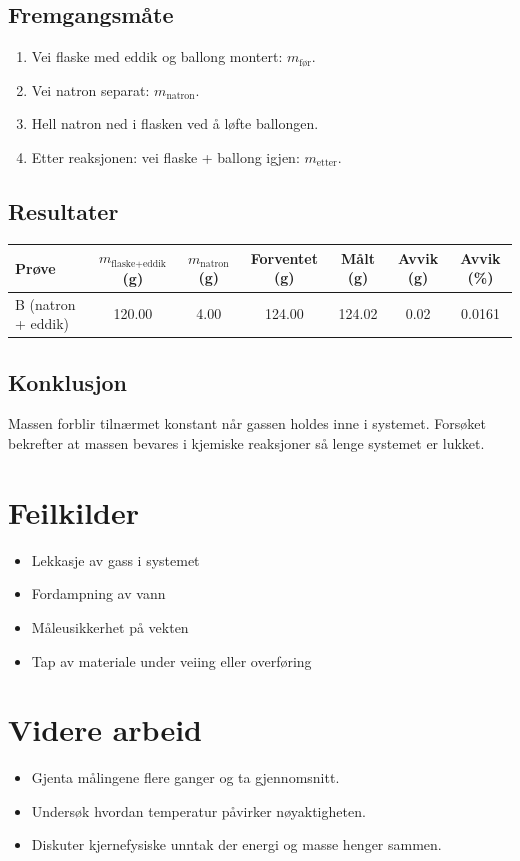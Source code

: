 \documentclass[a4paper,12pt]{article}
\begin{document}
\subsection*{Fremgangsmåte}
\begin{enumerate}
  \item Vei flaske med eddik og ballong montert: $m_\text{før}$.
  \item Vei natron separat: $m_\text{natron}$.
  \item Hell natron ned i flasken ved å løfte ballongen.
  \item Etter reaksjonen: vei flaske + ballong igjen: $m_\text{etter}$.
\end{enumerate}

\subsection*{Resultater}
\begin{table}[h!]
\centering
\begin{tabular}{lcccccc}
\toprule
Prøve & $m_\text{flaske+eddik}$ (g) & $m_\text{natron}$ (g) & Forventet (g) & Målt (g) & Avvik (g) & Avvik (\%) \\
\midrule
B (natron + eddik) & 120.00 & 4.00 & 124.00 & 124.02 & 0.02 & 0.0161 \\
\bottomrule
\end{tabular}
\end{table}

\subsection*{Konklusjon}
Massen forblir tilnærmet konstant når gassen holdes inne i systemet. Forsøket bekrefter at massen bevares i kjemiske reaksjoner så lenge systemet er lukket.

\section{Feilkilder}
\begin{itemize}
  \item Lekkasje av gass i systemet
  \item Fordampning av vann
  \item Måleusikkerhet på vekten
  \item Tap av materiale under veiing eller overføring
\end{itemize}

\section{Videre arbeid}
\begin{itemize}
  \item Gjenta målingene flere ganger og ta gjennomsnitt.
  \item Undersøk hvordan temperatur påvirker nøyaktigheten.
  \item Diskuter kjernefysiske unntak der energi og masse henger sammen.
\end{itemize}
\end{document}
